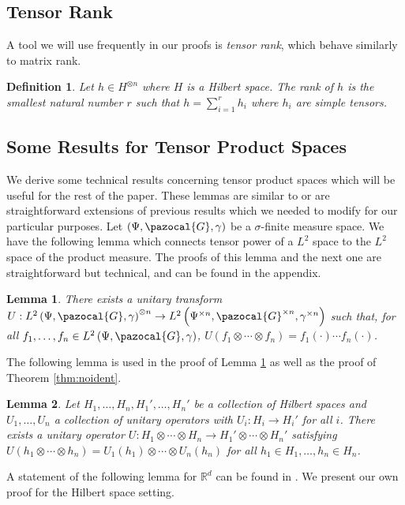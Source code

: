 \documentclass[aos]{imsart}
\def\rn{\mathbb{R}}
\def\sG{\pazocal{G}}
\theoremstyle{plain}
\newtheorem{lem}{Lemma}[section]
\theoremstyle{defintion}
\newtheorem{defin}{Definition}[section]
\begin{document}
	\subsection{Tensor Rank}
	A tool we will use frequently in our proofs is {\em tensor rank}, which behave similarly to matrix rank.
	\begin{defin} \label{def:tensrank}
		Let $h\in H^{\otimes n}$ where $H$ is a Hilbert space. The {\em rank} of $h$ is the smallest natural number $r$ such that $h =\sum_{i=1}^r h_i$ where $h_i$ are simple tensors.
	\end{defin}

	\subsection{Some Results for Tensor Product Spaces}
	We derive some technical results concerning tensor product spaces which will be useful for the rest of the paper. These lemmas are similar to or  are straightforward extensions of previous results which we needed to modify for our particular purposes. Let $\left( \Psi, \sG, \gamma \right)$ be a $\sigma$-finite measure space. We have the following lemma which connects tensor power of a $L^2$ space to the $L^2$ space of the product measure. The proofs of this lemma and the next one are straightforward but technical, and can be found in the appendix. 
	\begin{lem}
		\label{lem:l2prod}
		There exists a unitary transform $U:L^2\left( \Psi, \sG, \gamma \right)^{\otimes n} \to L^2\left( \Psi^{\times n}, \sG^{\times n}, \gamma^{\times n} \right)$ such that, for all $f_1,\ldots, f_n \in L^2\left( \Psi, \sG, \gamma \right)$, $U\left( f_1\otimes \cdots \otimes f_n \right) = f_1(\cdot)\cdots f_n(\cdot)$.
	\end{lem}
	The following lemma is used in the proof of Lemma \ref{lem:l2prod} as well as the proof of Theorem \ref{thm:noident}.
	\begin{lem} \label{lem:unitprod}
		Let $H_1,\ldots, H_n, H_1',\ldots, H_n'$ be a collection of Hilbert spaces and $U_1,\ldots,U_n$ a collection of unitary operators with $U_i:H_i \to H_i'$ for all $i$. There exists a unitary operator $U:H_1 \otimes \cdots \otimes H_n \to H_1' \otimes \cdots \otimes H_n'$ satisfying $U\left( h_1 \otimes\cdots \otimes h_n \right) = U_1(h_1) \otimes \cdots \otimes U_n(h_n)$ for all $h_1 \in H_1 ,\ldots, h_n \in H_n$.
	\end{lem}
	A statement of the following lemma for $\rn^d$ can be found in \cite{symtensorrank}. We present our own proof for the Hilbert space setting.
\end{document}
